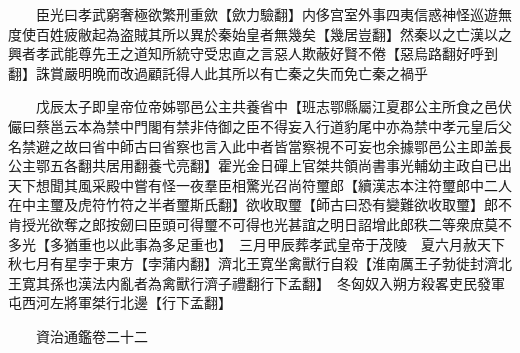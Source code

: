 　　臣光曰孝武窮奢極欲繁刑重歛【歛力驗翻】内侈宫室外事四夷信惑神怪巡遊無度使百姓疲敝起為盗賊其所以異於秦始皇者無幾矣【幾居豈翻】然秦以之亡漢以之興者孝武能尊先王之道知所統守受忠直之言惡人欺蔽好賢不倦【惡烏路翻好呼到翻】誅賞嚴明晩而改過顧託得人此其所以有亡秦之失而免亡秦之禍乎

　　戊辰太子即皇帝位帝姊鄂邑公主共養省中【班志鄂縣屬江夏郡公主所食之邑伏儼曰蔡邕云本為禁中門閣有禁非侍御之臣不得妄入行道豹尾中亦為禁中孝元皇后父名禁避之故曰省中師古曰省察也言入此中者皆當察視不可妄也余據鄂邑公主即盖長公主鄂五各翻共居用翻養弋亮翻】霍光金日磾上官桀共領尚書事光輔幼主政自已出天下想聞其風采殿中嘗有怪一夜羣臣相驚光召尚符璽郎【續漢志本注符璽郎中二人在中主璽及虎符竹符之半者璽斯氏翻】欲收取璽【師古曰恐有變難欲收取璽】郎不肯授光欲奪之郎按劒曰臣頭可得璽不可得也光甚誼之明日詔增此郎秩二等衆庶莫不多光【多猶重也以此事為多足重也】　三月甲辰葬孝武皇帝于茂陵　夏六月赦天下　秋七月有星孛于東方【孛蒲内翻】濟北王寛坐禽獸行自殺【淮南厲王子勃徙封濟北王寛其孫也漢法内亂者為禽獸行濟子禮翻行下孟翻】　冬匈奴入朔方殺畧吏民發軍屯西河左將軍桀行北邊【行下孟翻】

　　資治通鑑卷二十二


    


 


 



 

 
  







 


　　
　　
　
　
　


　　

　















	
	









































